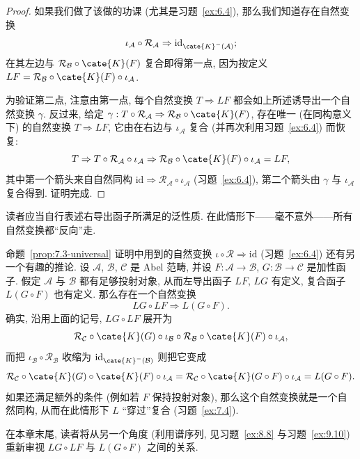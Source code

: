 \begin{proof}
如果我们做了该做的功课 (尤其是习题~\ref{ex:6.4}), 那么我们知道存在自然变换
\[
\iota_{\mathcal{A}}\circ\mathcal{R}_{\mathcal{A}} \Rightarrow \mathrm{id}_{\cate{K}^-(\mathcal{A})};
\]
在其左边与 $\mathcal{R}_{\mathcal{B}}\circ\cate{K}(F)$ 复合即得第一点, 因为按定义 $L F=\mathcal{R}_{\mathcal{B}}\circ\cate{K}(F)\circ\iota_{\mathcal{A}}$.

为验证第二点, 注意由第一点, 每个自然变换 $T\Rightarrow L F$ 都会如上所述诱导出一个自然变换 $\gamma$. 反过来, 给定 $\gamma:T\circ\mathcal{R}_{\mathcal{A}}\Rightarrow \mathcal{R}_{\mathcal{B}}\circ\cate{K}(F)$, 存在唯一 (在同构意义下) 的自然变换 $T\Rightarrow L F$, 它由在右边与 $\iota_{\mathcal{A}}$ 复合 (并再次利用习题~\ref{ex:6.4}) 而恢复:
\[
T \Rightarrow T\circ\mathcal{R}_{\mathcal{A}}\circ\iota_{\mathcal{A}} \Rightarrow \mathcal{R}_{\mathcal{B}}\circ\cate{K}(F)\circ\iota_{\mathcal{A}} = L F,
\]
其中第一个箭头来自自然同构 $\mathrm{id}\Rightarrow \mathcal{R}_{\mathcal{A}}\circ\iota_{\mathcal{A}}$ (习题~\ref{ex:6.4}), 第二个箭头由 $\gamma$ 与 $\iota_{\mathcal{A}}$ 复合得到. 证明完成.
\end{proof}

读者应当自行表述右导出函子所满足的泛性质. 在此情形下——毫不意外——所有自然变换都``反向''走.

\begin{remark}\label{rmk:7.4-composition}
命题~\ref{prop:7.3-universal} 证明中用到的自然变换 $\iota\circ\mathcal{R}\Rightarrow\mathrm{id}$ (习题~\ref{ex:6.4}) 还有另一个有趣的推论. 设 $\mathcal{A}$, $\mathcal{B}$, $\mathcal{C}$ 是 Abel 范畴, 并设 $F:\mathcal{A}\to\mathcal{B}$, $G:\mathcal{B}\to\mathcal{C}$ 是加性函子. 假定 $\mathcal{A}$ 与 $\mathcal{B}$ 都有足够投射对象, 从而左导出函子 $L F$, $L G$ 有定义, 复合函子 $L(G\circ F)$ 也有定义. 那么存在一个自然变换
\[
L G\circ L F \Rightarrow L(G\circ F).
\]
确实, 沿用上面的记号, $L G\circ L F$ 展开为
\[
\mathcal{R}_{\mathcal{C}}\circ\cate{K}(G)\circ\iota_{\mathcal{B}}\circ\mathcal{R}_{\mathcal{B}}\circ\cate{K}(F)\circ\iota_{\mathcal{A}},
\]
而把 $\iota_{\mathcal{B}}\circ\mathcal{R}_{\mathcal{B}}$ 收缩为 $\mathrm{id}_{\cate{K}^-(\mathcal{B})}$ 则把它变成
\[
\mathcal{R}_{\mathcal{C}}\circ\cate{K}(G)\circ\cate{K}(F)\circ\iota_{\mathcal{A}}=\mathcal{R}_{\mathcal{C}}\circ\cate{K}(G\circ F)\circ\iota_{\mathcal{A}}=L(G\circ F).
\]
如果还满足额外的条件 (例如若 $F$ 保持投射对象), 那么这个自然变换就是一个自然同构, 从而在此情形下 $L$ ``穿过''复合 (习题~\ref{ex:7.4}).

在本章末尾, 读者将从另一个角度 (利用谱序列, 见习题~\ref{ex:8.8} 与习题~\ref{ex:9.10}) 重新审视 $L G\circ L F$ 与 $L(G\circ F)$ 之间的关系.
\end{remark}

